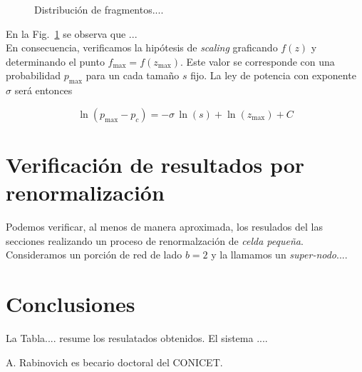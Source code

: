 \documentclass[%
 reprint,
 amsmath,amssymb,
 aps,
spanish]{revtex4-1}
\begin{document}
\begin{figure}[b]
\begin{center}
\caption{Distribuci\'on de fragmentos.... }\label{fig_1}
\end{center}
\end{figure}

En la Fig.~\ref{fig_1} se observa que ... \\


En consecuencia, verificamos la hip\'otesis de \emph{scaling} graficando $f(z)$  y determinando el punto $f_\mathrm{max}=f(z_\mathrm{max})$. Este valor se corresponde con una probabilidad $p_\mathrm{max}$ para un cada tama\~no $s$ fijo. La ley de potencia con exponente $\sigma$ ser\'a entonces

 
\begin{equation}
\ln(p_\mathrm{max}-p_c)=-\sigma\,\ln(s)+\ln(z_\mathrm{max})+C\label{eqn_3}
\end{equation}


\section{\label{R} Verificaci\'on de resultados por renormalizaci\'on}

Podemos verificar, al menos de manera aproximada, los resulados del las secciones realizando un proceso de renormalzaci\'on de \emph{celda peque\~na}. Consideramos un porci\'on de red de lado $b=2$ y la llamamos un \emph{super-nodo}....

\section{\label{conclusions}Conclusiones}

La Tabla.... resume los resulatados obtenidos. El sistema ....


\begin{acknowledgments}
A. Rabinovich es becario doctoral del CONICET. 
\end{acknowledgments}

\appendix
\end{document}
